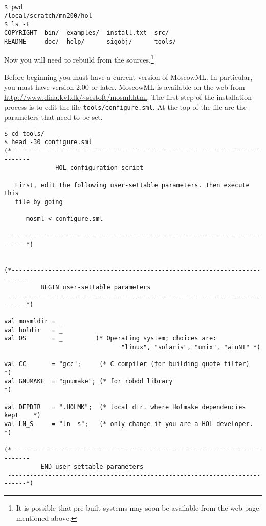 \setcounter{sessioncount}{0}
\begin{session}
\begin{verbatim}
$ pwd
/local/scratch/mn200/hol
$ ls -F
COPYRIGHT  bin/  examples/  install.txt  src/
README     doc/  help/      sigobj/      tools/
\end{verbatim}
\end{session}

Now you will need to rebuild \HOL{} from the sources.\footnote{It is
  possible that pre-built systems may soon be available from the
  web-page mentioned above.}

Before beginning you must have a current version of MoscowML.  In
particular, you must have version 2.00 or later.  MoscowML is
available on the web from
\url{http://www.dina.kvl.dk/~sestoft/mosml.html}. The first step of
the installation process is to edit the file
\texttt{tools/configure.sml}.  At the top of the file are the
parameters that need to be set.

\begin{session}
\begin{verbatim}
$ cd tools/
$ head -30 configure.sml
(*---------------------------------------------------------------------------
              HOL configuration script

   First, edit the following user-settable parameters. Then execute this
   file by going

      mosml < configure.sml

 ---------------------------------------------------------------------------*)


(*---------------------------------------------------------------------------
          BEGIN user-settable parameters
 ---------------------------------------------------------------------------*)

val mosmldir = _
val holdir   = _
val OS       = _         (* Operating system; choices are:
                                "linux", "solaris", "unix", "winNT" *)

val CC       = "gcc";     (* C compiler (for building quote filter)        *)
val GNUMAKE  = "gnumake"; (* for robdd library                             *)

val DEPDIR   = ".HOLMK";  (* local dir. where Holmake dependencies kept    *)
val LN_S     = "ln -s";   (* only change if you are a HOL developer.       *)

(*---------------------------------------------------------------------------
          END user-settable parameters
 ---------------------------------------------------------------------------*)
\end{verbatim}
\end{session}

